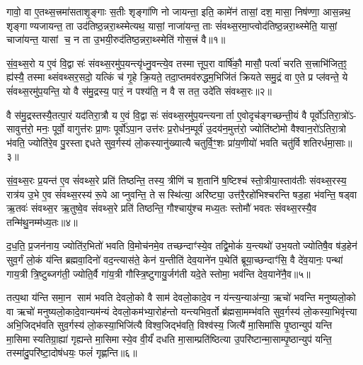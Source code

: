 \setcounter{anuvakam}{0}
गावो॒ वा ए॒तथ्स॒त्त्रमा॑सताशृ॒ङ्गाः स॒तीः शृङ्गा॑णि नो जायन्ता॒ इति॒ कामे॑न॑ तासां॒ दश॒ मासा॒ निष॑ण्णा॒ आस॒न्नथ॒ शृङ्गाण्यजायन्त॒ ता उद॑तिष्ठ॒न्नरा॒थ्स्मेत्यथ॒ यासां॒ नाजा॑यन्त॒ ताः सं॑वथ्स॒रमा॒प्त्वोद॑तिष्ठ॒न्नरा॒थ्स्मेति॒ यासां॒ चाजा॑यन्त॒ यासां च॒ न ता उ॒भयी॒रुद॑तिष्ठ॒न्नरा॒थ्स्मेति॑ गोस॒त्त्रं वै॥१॥

सं॒व॒थ्स॒रो य ए॒वं वि॒द्वासः॑ संवथ्स॒रमु॑प॒यन्त्यृ॑ध्नु॒वन्त्ये॒व तस्मात्तूप॒रा वार्\mbox{}षि॑कौ॒ मासौ॒ पर्त्वा॑ चरति स॒त्त्राभि॑जित॒ꣵ॒ ह्य॑स्यै॒ तस्माथ्संवथ्सर॒सदो॒ यत्किं च॑ गृ॒हे क्रि॒यते॒ तदा॒प्तमव॑रुद्धम॒भिजि॑तं क्रियते समु॒द्रं वा ए॒ते प्र प्ल॑वन्ते॒ ये सं॑वथ्स॒रमु॑प॒यन्ति॒ यो वै स॑मु॒द्रस्य॒ पारं॒ न पश्य॑ति॒ न वै स तत॒ उदे॑ति संवथ्स॒रः॥२॥

वै स॑मु॒द्रस्तस्यै॒तत्पा॒रं यद॑तिरा॒त्रौ य ए॒वं वि॒द्वासः॑ संवथ्स॒रमु॑प॒यन्त्यनार्ता ए॒वोदृच॑ङ्गच्छन्ती॒यं वै पूर्वो॑ऽतिरा॒त्रो॑ऽ- सावुत्त॑रो॒ मनः॒ पूर्वो॒ वागुत्त॑रः प्रा॒णः पूर्वो॑ऽपा॒न उत्त॑रः प्र॒रोध॑न॒म्पूर्व॑ उ॒दय॑न॒मुत्त॑रो॒ ज्योति॑ष्टोमो वैश्वान॒रो॑ऽतिरा॒त्रो भ॑वति॒ ज्योति॑रे॒व पु॒रस्ताद्दधते सुव॒र्गस्य॑ लो॒कस्यानु॑ख्यात्यै चतुर्वि॒ꣳ॒शः प्रा॑य॒णीयो॑ भवति चतु॑र्विशतिरर्धमा॒साः॥३॥

सं॒व॒थ्स॒रः प्र॒यन्त॑ ए॒व सं॑वथ्स॒रे प्रति॑ तिष्ठन्ति॒ तस्य॒ त्रीणि॑ च श॒तानि॑ ष॒ष्टिश्च॑ स्तो॒त्रीया॒स्ताव॑तीः संवथ्स॒रस्य॒ रात्र॑य उ॒भे ए॒व सं॑वथ्स॒रस्य॑ रू॒पे आप्नुवन्ति॒ ते सस्थि॑त्या॒ अरि॑ष्ट्या॒ उत्त॑रै॒रहो॑भिश्चरन्ति षड॒हा भ॑वन्ति॒ षड्वा ऋ॒तवः॑ संवथ्स॒र ऋ॒तुष्वे॒व सं॑वथ्स॒रे प्रति॑ तिष्ठन्ति॒ गौश्चायु॑श्च मध्य॒तः स्तोमौ॑ भवतः संवथ्स॒रस्यै॒व तन्मि॑थु॒नम्म॑ध्य॒तः॥४॥

द॒ध॒ति॒ प्र॒जन॑नाय॒ ज्योति॑र॒भितो॑ भवति वि॒मोच॑नमे॒व तच्छन्दाꣳ॑स्ये॒व तद्वि॒मोकं॑ य॒न्त्यथो॑ उभ॒यतोज्योतिषै॒व ष॑ड॒हेन॑ सुव॒र्गं लो॒कं य॑न्ति ब्रह्मवा॒दिनो॑ वद॒न्त्यास॑ते॒ केन॑ य॒न्तीति॑ देव॒याने॑न प॒थेति॑ ब्रूया॒च्छन्दाꣳ॑सि॒ वै दे॑व॒यानः॒ पन्था॑ गाय॒त्री त्रि॒ष्टुब्जग॑ती॒ ज्योति॒र्वै गा॑य॒त्री गौस्त्रि॒ष्टुगायु॒र्जग॑ती यदे॒ते स्तोमा॒ भव॑न्ति देव॒याने॑नै॒व॥५॥

तत्प॒था य॑न्ति समा॒न साम॑ भवति देवलो॒को वै साम॑ देवलो॒कादे॒व न य॑न्त्य॒न्याअ॑न्या॒ ऋचो॑ भवन्ति मनुष्यलो॒को वा ऋचो॑ मनुष्यलो॒कादे॒वान्यम॑न्यं देवलो॒कम॑भ्या॒रोह॑न्तो यन्त्यभिव॒र्तो ब्र॑ह्मसा॒मम्भ॑वति सुव॒र्गस्य॑ लो॒कस्या॒भिवृ॑त्त्या अभि॒जिद्भ॑वति सुव॒र्गस्य॑ लो॒कस्या॒भिजि॑त्यै विश्व॒जिद्भ॑वति॒ विश्व॑स्य॒ जित्यै॑ मा॒सिमा॑सि पृ॒ष्ठान्युप॑ यन्ति मा॒सिमास्यतिग्रा॒ह्या॑ गृह्यन्ते मा॒सिमास्ये॒व वी॒र्यं॑ दधति मा॒साम्प्रति॑ष्ठित्या उ॒परि॑ष्टान्मा॒साम्पृ॒ष्ठान्युप॑ यन्ति॒ तस्मा॑दु॒परि॑ष्टा॒दोष॑धयः॒ फलं॑ गृह्णन्ति॥६॥

